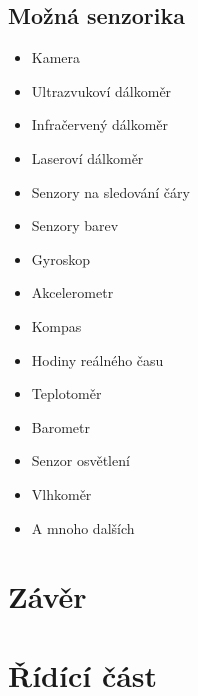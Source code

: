 \documentclass{template/socthesis}
\begin{document}
\section{Možná senzorika}
\begin{itemize}
\item Kamera
\item Ultrazvukoví dálkoměr
\item Infračervený dálkoměr
\item Laseroví dálkoměr
\item Senzory na sledování čáry
\item Senzory barev
\item Gyroskop
\item Akcelerometr
\item Kompas
\item Hodiny reálného času
\item Teplotoměr
\item Barometr
\item Senzor osvětlení
\item Vlhkoměr
\item A mnoho dalších
\end{itemize}



\chapter*{Závěr} %



\appendix
{}
	

\chapter{Řídící část}
	
\end{document}
